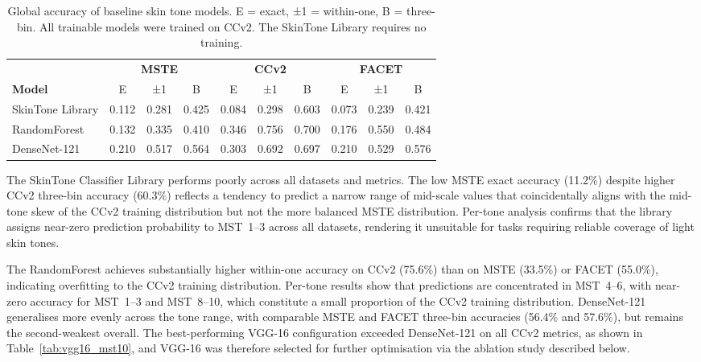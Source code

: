 \begin{table}[htbp]
	\centering
	\caption{Global accuracy of baseline skin tone models. E = exact, ±1 = within-one, B = three-bin. All trainable models were trained on CCv2. The SkinTone Library requires no training.}
	\label{tab:skintone_baseline}
	\begin{tabular}{lccccccccc}
		\toprule
		& \multicolumn{3}{c}{\textbf{MSTE}} & \multicolumn{3}{c}{\textbf{CCv2}} & \multicolumn{3}{c}{\textbf{FACET}} \\
		\cmidrule(lr){2-4} \cmidrule(lr){5-7} \cmidrule(lr){8-10}
		\textbf{Model} & E & ±1 & B & E & ±1 & B & E & ±1 & B \\
		\midrule
		SkinTone Library & 0.112 & 0.281 & 0.425 & 0.084 & 0.298 & 0.603 & 0.073 & 0.239 & 0.421 \\
		RandomForest     & 0.132 & 0.335 & 0.410 & 0.346 & 0.756 & 0.700 & 0.176 & 0.550 & 0.484 \\
		DenseNet-121     & 0.210 & 0.517 & 0.564 & 0.303 & 0.692 & 0.697 & 0.210 & 0.529 & 0.576 \\
		\bottomrule
	\end{tabular}
\end{table}

The SkinTone Classifier Library performs poorly across all datasets and metrics. The low MSTE exact accuracy (11.2\%) despite higher CCv2 three-bin accuracy (60.3\%) reflects a tendency to predict a narrow range of mid-scale values that coincidentally aligns with the mid-tone skew of the CCv2 training distribution but not the more balanced MSTE distribution. Per-tone analysis confirms that the library assigns near-zero prediction probability to MST~1--3 across all datasets, rendering it unsuitable for tasks requiring reliable coverage of light skin tones.

The RandomForest achieves substantially higher within-one accuracy on CCv2 (75.6\%) than on MSTE (33.5\%) or FACET (55.0\%), indicating overfitting to the CCv2 training distribution. Per-tone results show that predictions are concentrated in MST~4--6, with near-zero accuracy for MST~1--3 and MST~8--10, which constitute a small proportion of the CCv2 training distribution. DenseNet-121 generalises more evenly across the tone range, with comparable MSTE and FACET three-bin accuracies (56.4\% and 57.6\%), but remains the second-weakest overall. The best-performing VGG-16 configuration exceeded DenseNet-121 on all CCv2 metrics, as shown in Table~\ref{tab:vgg16_mst10}, and VGG-16 was therefore selected for further optimisation via the ablation study described below.

